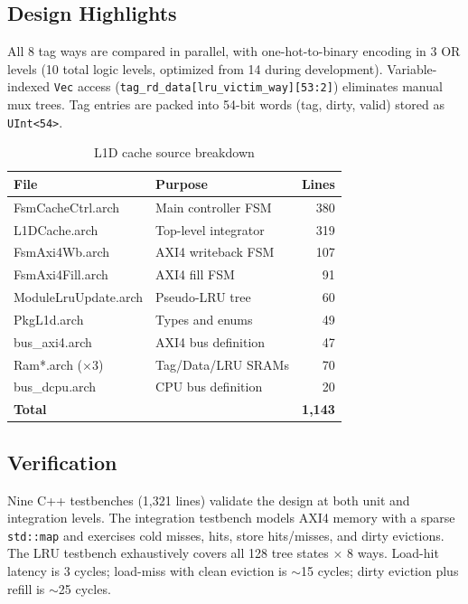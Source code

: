 \documentclass[11pt,twocolumn]{article}
\begin{document}
\subsection{Design Highlights}

All 8 tag ways are compared in parallel, with one-hot-to-binary encoding in 3 OR levels (10 total logic levels, optimized from 14 during development). Variable-indexed \texttt{Vec} access (\texttt{tag\_rd\_data[lru\_victim\_way][53:2]}) eliminates manual mux trees. Tag entries are packed into 54-bit words (tag, dirty, valid) stored as \texttt{UInt<54>}.

\begin{table}[t]
\centering
\caption{L1D cache source breakdown}
\label{tab:l1d}
\footnotesize
\begin{tabular}{@{}llr@{}}
\toprule
\textbf{File} & \textbf{Purpose} & \textbf{Lines} \\
\midrule
FsmCacheCtrl.arch & Main controller FSM & 380 \\
L1DCache.arch & Top-level integrator & 319 \\
FsmAxi4Wb.arch & AXI4 writeback FSM & 107 \\
FsmAxi4Fill.arch & AXI4 fill FSM & 91 \\
ModuleLruUpdate.arch & Pseudo-LRU tree & 60 \\
PkgL1d.arch & Types and enums & 49 \\
bus\_axi4.arch & AXI4 bus definition & 47 \\
Ram*.arch ($\times$3) & Tag/Data/LRU SRAMs & 70 \\
bus\_dcpu.arch & CPU bus definition & 20 \\
\midrule
\textbf{Total} & & \textbf{1,143} \\
\bottomrule
\end{tabular}
\end{table}

\subsection{Verification}

Nine C++ testbenches (1,321 lines) validate the design at both unit and integration levels. The integration testbench models AXI4 memory with a sparse \texttt{std::map} and exercises cold misses, hits, store hits/misses, and dirty evictions. The LRU testbench exhaustively covers all 128 tree states $\times$ 8 ways. Load-hit latency is 3 cycles; load-miss with clean eviction is ${\sim}$15 cycles; dirty eviction plus refill is ${\sim}$25 cycles.
\end{document}
